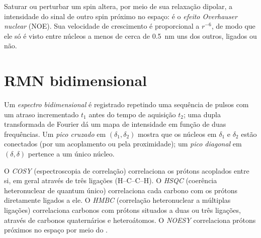 \begin{definition}\label{def:b3:advanced-nmr:noe}
Saturar ou perturbar um spin altera, por meio de sua relaxação dipolar, a
intensidade do sinal de outro spin próximo no espaço: é o \emph{efeito Overhauser
nuclear} (NOE). Sua velocidade de crescimento
é proporcional a $r^{-6}$, de modo que ele só é visto entre núcleos a menos de
cerca de \qty{0.5}{nm} uns dos outros, ligados ou não.
\end{definition}

\section{RMN bidimensional}

\begin{definition}\label{def:b3:advanced-nmr:two-d}
Um \emph{espectro bidimensional} é registrado
repetindo uma sequência de pulsos com um atraso incrementado $t_1$ antes do
tempo de aquisição $t_2$; uma dupla transformada de Fourier dá um mapa de
intensidade em função de duas frequências. Um \emph{pico cruzado} em $(\delta_1,
\delta_2)$ mostra que os núcleos em $\delta_1$ e $\delta_2$ estão conectados (por um acoplamento ou
pela proximidade); um \emph{pico diagonal} em $(\delta, \delta)$ pertence a
um único núcleo.
\end{definition}

\begin{definition}\label{def:b3:advanced-nmr:experiments}
O \emph{COSY} (espectroscopia de correlação) correlaciona os prótons
acoplados entre si, em geral através de três ligações (H--C--C--H). O \emph{HSQC}
(coerência heteronuclear de quantum único) correlaciona cada carbono com os
prótons diretamente ligados a ele. O \emph{HMBC} (correlação
heteronuclear a múltiplas ligações) correlaciona carbonos com prótons situados a duas ou três
ligações, através de carbonos quaternários e heteroátomos. O \emph{NOESY}
correlaciona prótons próximos no espaço por meio do .
\end{definition}

